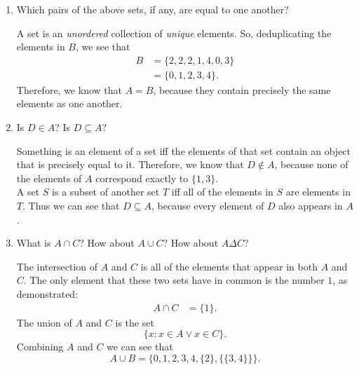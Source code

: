 \documentclass{article}
\renewcommand{\(}{\left(}
\renewcommand{\)}{\right)}
\theoremstyle{plain}
\theoremstyle{plain}
\theoremstyle{definition}
\begin{document}
\begin{enumerate}[label*=\roman*.,ref=\roman*]

\item Which pairs of the above sets, if any, are equal to one another?

\begin{shaded}
A set is an \textit{unordered} collection of \textit{unique} elements. So, deduplicating the elements in $B$, we see that 
\begin{equation}
  \begin{aligned}
	B & = \{2, 2, 2, 1, 4, 0, 3\} \\
  	  & = \{0, 1, 2, 3, 4\}.
  \end{aligned}
\end{equation}
Therefore, we know that $A = B$, because they contain precisely the same elements as one another. 
\end{shaded}

\item Is $D \in A$? Is $D \subseteq A$?

\begin{shaded}
Something is an element of a set iff the elements of that set contain an object that is precisely equal to it. Therefore, we know that $D \notin A$, because none of the elements of $A$ correspond exactly to $\{1, 3\}$. \\

A set $S$ is a subset of another set $T$ iff all of the elements in $S$ are elements in $T$. Thus we can see that $D \subseteq A$, because every element of $D$ also appears in $A$.
\end{shaded}

\item What is $A \cap C$? How about $A \cup C$? How about $A \Delta C$?

\begin{shaded}
The intersection of $A$ and $C$ is all of the elements that appear in both $A$ and $C$. The only element that these two sets have in common is the number $1$, as demonstrated:
\begin{equation} \label{eq:8}
	\begin{aligned}
		A \cap C & = \{1\}.
	\end{aligned}
\end{equation}
The union of $A$ and $C$ is the set \begin{equation}
\{x: x \in A \lor x \in C\}.
\end{equation}
Combining $A$ and $C$ we can see that
\begin{equation}
A \cup B = \{0, 1, 2, 3, 4, \{2\}, \{\{3, 4\}\}\}.
\end{equation}


\end{shaded}
\end{enumerate}
\end{document}
